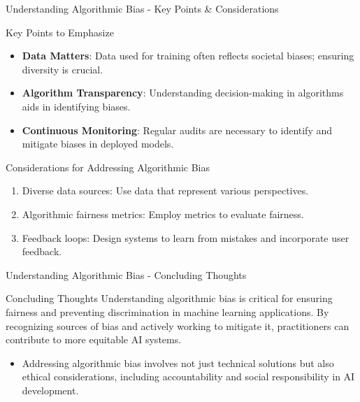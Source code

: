 \documentclass[aspectratio=169]{beamer}
\begin{document}
\begin{frame}[fragile]{Understanding Algorithmic Bias - Key Points & Considerations}
  \begin{block}{Key Points to Emphasize}
    \begin{itemize}
      \item \textbf{Data Matters}: Data used for training often reflects societal biases; ensuring diversity is crucial.
      \item \textbf{Algorithm Transparency}: Understanding decision-making in algorithms aids in identifying biases.
      \item \textbf{Continuous Monitoring}: Regular audits are necessary to identify and mitigate biases in deployed models.
    \end{itemize}
  \end{block}
  
  \begin{block}{Considerations for Addressing Algorithmic Bias}
    \begin{enumerate}
      \item Diverse data sources: Use data that represent various perspectives.
      \item Algorithmic fairness metrics: Employ metrics to evaluate fairness.
      \item Feedback loops: Design systems to learn from mistakes and incorporate user feedback.
    \end{enumerate}
  \end{block}
\end{frame}

\begin{frame}[fragile]{Understanding Algorithmic Bias - Concluding Thoughts}
  \begin{block}{Concluding Thoughts}
    Understanding algorithmic bias is critical for ensuring fairness and preventing discrimination in machine learning applications. By recognizing sources of bias and actively working to mitigate it, practitioners can contribute to more equitable AI systems.
  \end{block}

  \begin{itemize}
    \item Addressing algorithmic bias involves not just technical solutions but also ethical considerations, including accountability and social responsibility in AI development.
  \end{itemize}
\end{frame}
\end{document}
